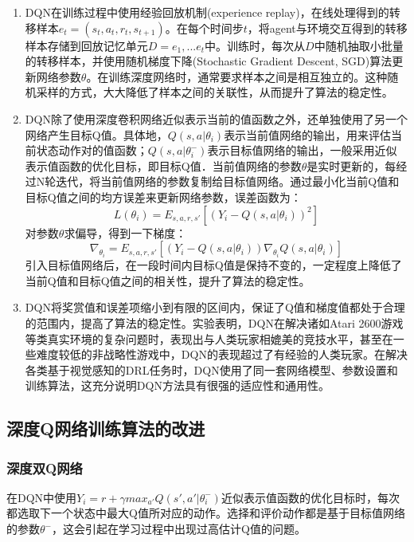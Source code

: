 \documentclass[bachelor]{thesis-uestc}
\begin{document}
	\begin{enumerate}
		\item DQN在训练过程中使用经验回放机制(experience replay)，在线处理得到的转移样本$e_t=(s_t,a_t,r_t,s_{t+1})$。在每个时间步$t$，将agent与环境交互得到的转移样本存储到回放记忆单元$D={e_1,...e_t}$中。训练时，每次从$D$中随机抽取小批量的转移样本，并使用随机梯度下降(Stochastic Gradient Descent, SGD)算法更新网络参数$\theta$。在训练深度网络时，通常要求样本之间是相互独立的。这种随机采样的方式，大大降低了样本之间的关联性，从而提升了算法的稳定性。
		
		\item DQN除了使用深度卷积网络近似表示当前的值函数之外，还单独使用了另一个网络产生目标Q值。具体地，$Q(s,a|\theta_i)$表示当前值网络的输出，用来评估当前状态动作对的值函数；$Q(s,a|\theta^-_i)$表示目标值网络的输出，一般采用近似表示值函数的优化目标，即目标Q值．当前值网络的参数$\theta$是实时更新的，每经过N轮迭代，将当前值网络的参数复制给目标值网络。通过最小化当前Q值和目标Q值之间的均方误差来更新网络参数，误差函数为：
		\begin{equation}
			\label{eq6}
			L(\theta_i)=E_{s,a,r,s'}[(Y_i-Q(s,a|\theta_i))^2]
		\end{equation}
		对参数$\theta$求偏导，得到一下梯度：
		\begin{equation}
			\label{eq7}
			\nabla_{\theta_i}=E_{s,a,r,s'}[(Y_i-Q(s,a|\theta_i))\nabla_{\theta_i}Q(s,a|\theta_i)]
		\end{equation}
		引入目标值网络后，在一段时间内目标Q值是保持不变的，一定程度上降低了当前Q值和目标Q值之间的相关性，提升了算法的稳定性。
		
		\item DQN将奖赏值和误差项缩小到有限的区间内，保证了Q值和梯度值都处于合理的范围内，提高了算法的稳定性。实验表明，DQN在解决诸如Atari 2600游戏等类真实环境的复杂问题时，表现出与人类玩家相媲美的竞技水平，甚至在一些难度较低的非战略性游戏中，DQN的表现超过了有经验的人类玩家。在解决各类基于视觉感知的DRL任务时，DQN使用了同一套网络模型、参数设置和训练算法，这充分说明DQN方法具有很强的适应性和通用性。
	\end{enumerate}

	\subsection{深度Q网络训练算法的改进}
	\subsubsection{深度双Q网络}\label{sec1}
	在DQN中使用$Y_i=r+\gamma max_{a'}Q(s',a'|\theta_i^-)$近似表示值函数的优化目标时，每次都选取下一个状态中最大Q值所对应的动作。选择和评价动作都是基于目标值网络的参数$\theta^-$，这会引起在学习过程中出现过高估计Q值的问题。
	
\end{document}
